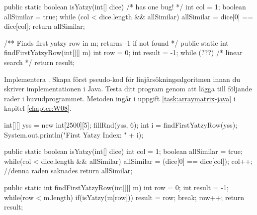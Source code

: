 \begin{Code}[language=Java]
    public static boolean isYatzy(int[] dice){ /* has one bug! */
        int col = 1;
        boolean allSimilar = true;
        while (col < dice.length && allSimilar) {
          allSimilar = dice[0] == dice[col];
        }
        return allSimilar;
    }

    /** Finds first yatzy row in m; returns -1 if not found */
    public static int findFirstYatzyRow(int[][] m){
        int row = 0;
        int result = -1;
        while (???) {
             /* linear search  */
        }
        return result;
    }
\end{Code}


\Subtask Implementera . Skapa först pseudo-kod för linjärsökningsalgoritmen innan du skriver implementationen i Java.
Testa ditt program genom att lägga till följande rader i huvudprogrammet.
Metoden  ingår i uppgift \ref{task:arraymatrix-java} i kapitel \ref{chapter:W08}.
\begin{Code}[language=Java]
        int[][] yss = new int[2500][5];
        fillRnd(yss, 6);
        int i = findFirstYatzyRow(yss);
        System.out.println("First Yatzy Index: " + i);
\end{Code}




\SOLUTION


\TaskSolved \what


\SubtaskSolved
\begin{Code}
public static boolean isYatzy(int[] dice){
    int col = 1;
    boolean allSimilar = true;
    while(col < dice.length && allSimilar){
        allSimilar = (dice[0] == dice[col]);
        col++; //denna raden saknades
    }
    return allSimilar;
}
\end{Code}

\SubtaskSolved

\begin{Code}[language=Java]
public static int findFirstYatzyRow(int[][] m){
    int row = 0;
    int result = -1;
    while(row < m.length){
        if(isYatzy(m[row])){
           result = row;
           break;
        }
        row++;
    }
    return result;
}
\end{Code}



\QUESTEND









